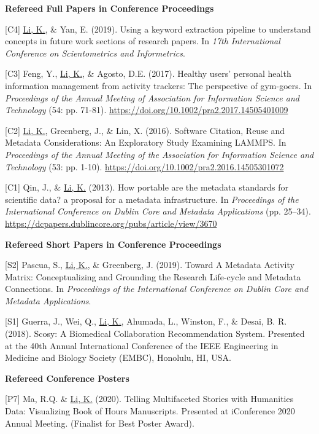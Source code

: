 \documentclass[margin, 10pt]{res} %
\begin{document}
\begin{resume}
\textbf{Refereed Full Papers in Conference Proceedings}

[C4] \underline{Li, K.}, \& Yan, E. (2019). Using a keyword extraction pipeline to understand concepts in future work sections of research papers. In \textit{17th International Conference on Scientometrics and Informetrics}.

[C3] Feng, Y., \underline{Li, K.}, \& Agosto, D.E. (2017). Healthy users’ personal health information management from activity trackers: The perspective of gym-goers. In \textit{Proceedings of the Annual Meeting of Association for Information Science and Technology} (54: pp. 71-81). \href{https://doi.org/10.1002/pra2.2017.14505401009}{https://doi.org/10.1002/pra2.2017.14505401009}

[C2] \underline{Li, K.}, Greenberg, J., \& Lin, X. (2016). Software Citation, Reuse and Metadata Considerations: An Exploratory Study Examining LAMMPS. In \textit{Proceedings of the Annual Meeting of the Association for Information Science and Technology} (53: pp. 1-10). \href{https://doi.org/10.1002/pra2.2016.14505301072}{https://doi.org/10.1002/pra2.2016.14505301072}

[C1] Qin, J., \& \underline{Li, K.} (2013). How portable are the metadata standards for scientific data? a proposal for a metadata infrastructure. In \textit{Proceedings of the International Conference on Dublin Core and Metadata Applications} (pp. 25–34). \href{https://dcpapers.dublincore.org/pubs/article/view/3670}{https://dcpapers.dublincore.org/pubs/article/view/3670}

\textbf{Refereed Short Papers in Conference Proceedings}

[S2] Pascua, S., \underline{Li, K.}, \& Greenberg, J. (2019). Toward A Metadata Activity Matrix: Conceptualizing and Grounding the Research Life-cycle and Metadata Connections. In \textit{Proceedings of the International Conference on Dublin Core and Metadata Applications}.

[S1] Guerra, J., Wei, Q., \underline{Li, K.}, Ahumada, L., Winston, F., \& Desai, B. R. (2018). Scosy: A Biomedical Collaboration Recommendation System. Presented at the 40th Annual International Conference of the IEEE Engineering in Medicine and Biology Society (EMBC), Honolulu, HI, USA.

\textbf{Refereed Conference Posters}

[P7] Ma, R.Q. \& \underline{Li, K.} (2020). Telling Multifaceted Stories with Humanities Data: Visualizing Book of Hours Manuscripts. Presented at iConference 2020 Annual Meeting. (Finalist for Best Poster Award).


\end{resume}
\end{document}
